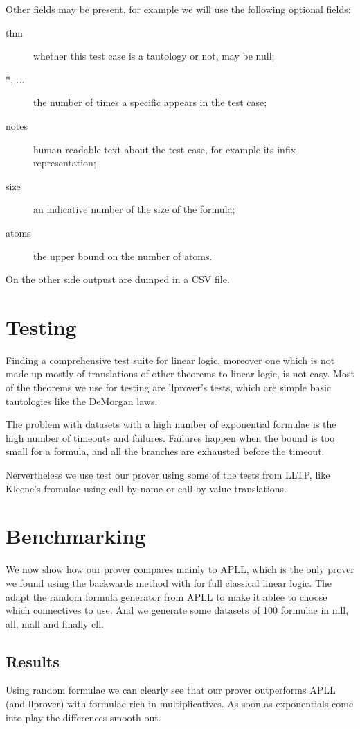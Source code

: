\documentclass[a4paper, 12pt, tesi, english]{report}
\begin{document}
Other fields may be present, for example we will use the following optional fields:
\begin{description}
	\item[thm] whether this test case is a tautology or not, may be null;
	\item[*, ...] the number of times a specific appears in the test case;
	\item[notes] human readable text about the test case, for example its infix representation;
	\item[size] an indicative number of the size of the formula;
	\item[atoms] the upper bound on the number of atoms.
\end{description}

On the other side outpust are dumped in a CSV file.

\section{Testing}
Finding a comprehensive test suite for linear logic, moreover one which is not made up mostly of translations of other theorems to linear logic, is not easy.
Most of the theorems we use for testing are llprover's %
tests, which are simple basic tautologies like the DeMorgan laws.

The problem with datasets with a high number of exponential formulae is the high number of timeouts and failures.
Failures happen when the bound is too small for a formula, and all the branches are exhausted before the timeout.

Nervertheless we use test our prover using some of the tests from LLTP, like Kleene's fromulae using call-by-name or call-by-value translations. %

\section{Benchmarking}
We now show how our prover compares mainly to APLL, which is the only prover we found using the backwards method with for full classical linear logic.
The adapt the random formula generator from APLL to make it ablee to choose which connectives to use.
And we generate some datasets of 100 formulae in mll, all, mall and finally cll.

\subsection{Results}
Using random formulae we can clearly see that our prover outperforms APLL (and llprover) with formulae rich in multiplicatives.
As soon as exponentials come into play the differences smooth out.
\end{document}
